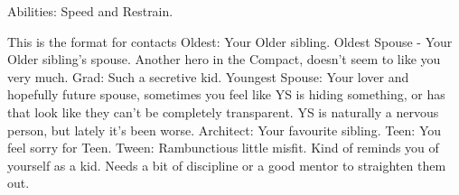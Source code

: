\documentclass[char]{LRSguildcamp1}
\begin{document}
\begin{itemz}[Notes]
	\item 
	Abilities: Speed and Restrain.
\end{itemz}

\begin{contacts}
	\contact{}  This is the format for contacts 
	Oldest: Your Older sibling. 
	Oldest Spouse - Your Older sibling’s spouse. Another hero in the Compact, doesn’t seem to like you very much. 
	Grad: Such a secretive kid. 
	Youngest Spouse: Your lover and hopefully future spouse, sometimes you feel like YS is hiding something, or has that look like they can’t be completely transparent. YS is naturally a nervous person, but lately it’s been worse. 
	Architect: Your favourite sibling. 
	Teen: You feel sorry for Teen. 
	Tween: Rambunctious little misfit. Kind of reminds you of yourself as a kid. Needs a bit of discipline or a good mentor to straighten them out. 
	
\end{contacts}
\end{document}
